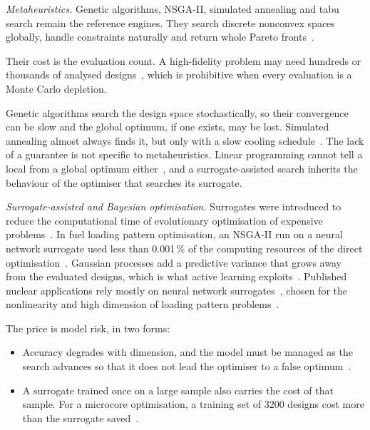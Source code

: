 \emph{Metaheuristics.} Genetic algorithms, NSGA-II, simulated annealing
and tabu search remain the reference engines. They search discrete
nonconvex spaces globally, handle constraints naturally and return whole
Pareto fronts~\cite{deb_nsga2_2002,kropaczek_turinsky_1991}.

Their cost is the evaluation count. A high-fidelity problem may need
hundreds or thousands of analysed designs~\cite{stewart_2021}, which is
prohibitive when every evaluation is a Monte Carlo depletion.

Genetic algorithms search the design space stochastically, so their
convergence can be slow and the global optimum, if one exists, may be
lost. Simulated annealing almost always finds it, but only with a slow
cooling schedule~\cite{stewart_2021}. The lack of a guarantee is not
specific to metaheuristics. Linear programming cannot tell a local from a
global optimum either~\cite{downar_1988}, and a surrogate-assisted search
inherits the behaviour of the optimiser that searches its surrogate.

\emph{Surrogate-assisted and Bayesian optimisation.} Surrogates were
introduced to reduce the computational time of evolutionary optimisation
of expensive problems~\cite{jin_2011}. In fuel loading pattern
optimisation, an NSGA-II run on a neural network surrogate used less
than 0.001\,\% of the computing resources of the direct optimisation~\cite{whyte_2020}. Gaussian processes add a predictive
variance that grows away from the evaluated designs, which is what
active learning exploits~\cite{rasmussen_gp_2006}. Published nuclear
applications rely mostly on neural network
surrogates~\cite{whyte_2020,wan_2022}, chosen for the nonlinearity and
high dimension of loading pattern problems~\cite{whyte_2020}.

The price is model risk, in two forms:

\begin{itemize}
  \item Accuracy degrades with dimension, and the model must be managed
        as the search advances so that it does not lead the optimiser to
        a false optimum~\cite{jin_2011}.

  \item A surrogate trained once on a large sample also carries the cost
        of that sample. For a microcore optimisation, a training set of
        3200 designs cost more than the surrogate saved~\cite{whyte_2020}.
\end{itemize}

